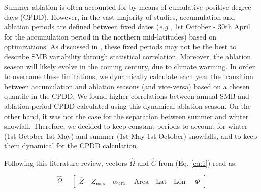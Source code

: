Summer ablation is often accounted for by means of cumulative positive degree days (CPDD). However, in the vast majority of studies, accumulation and ablation periods are defined between fixed dates (\textit{e.g.}, 1st October - 30th April for the accumulation period in the northern mid-latitudes) based on optimizations. As discussed in \citet{zekollari_statistical_2018}, these fixed periods may not be the best to describe SMB variability through statistical correlation. Moreover, the ablation season will likely evolve in the coming century, due to climate warming. In order to overcome these limitations, we dynamically calculate each year the transition between accumulation and ablation seasons (and vice-versa) based on a chosen quantile in the CPDD. We found higher correlations between annual SMB and ablation-period CPDD calculated using this dynamical ablation season. On the other hand, it was not the case for the separation between summer and winter snowfall. Therefore, we decided to keep constant periods to account for winter (1st October-1st May) and summer (1st May-1st October) snowfalls, and to keep them dynamical for the CPDD calculation.

Following this literature review, vectors $\hat{\Omega}$ and $\hat{C}$ from (Eq. \ref{eq:1}) read as:

\begin{equation} \label{eq:2}
\hat{\Omega}=\left[\begin{array}{lllllll}{\overline{Z}   \quad Z_{\max }   \quad \alpha_{20\%}  \quad \text {Area}  \quad \text{Lat}  \quad \text{Lon }  \quad \Phi }\end{array}\right]
\end{equation}

